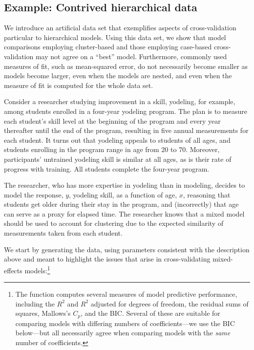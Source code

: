 \documentclass[
]{jss}
\begin{document}
\hypertarget{example-contrived-hierarchical-data}{%
\subsection{Example: Contrived hierarchical
data}\label{example-contrived-hierarchical-data}}

We introduce an artificial data set that exemplifies aspects of
cross-validation particular to hierarchical models. Using this data set,
we show that model comparisons employing cluster-based and those
employing case-based cross-validation may not agree on a ``best'' model.
Furthermore, commonly used measures of fit, such as mean-squared error,
do not necessarily become smaller as models become larger, even when the
models are nested, and even when the measure of fit is computed for the
whole data set.

Consider a researcher studying improvement in a skill, yodeling, for
example, among students enrolled in a four-year yodeling program. The
plan is to measure each student's skill level at the beginning of the
program and every year thereafter until the end of the program,
resulting in five annual measurements for each student. It turns out
that yodeling appeals to students of all ages, and students enrolling in
the program range in age from 20 to 70. Moreover, participants'
untrained yodeling skill is similar at all ages, as is their rate of
progress with training. All students complete the four-year program.

The researcher, who has more expertise in yodeling than in modeling,
decides to model the response, \(y\), yodeling skill, as a function of
age, \(x\), reasoning that students get older during their stay in the
program, and (incorrectly) that age can serve as a proxy for elapsed
time. The researcher knows that a mixed model should be used to account
for clustering due to the expected similarity of measurements taken from
each student.

We start by generating the data, using parameters consistent with the
description above and meant to highlight the issues that arise in
cross-validating mixed-effects models:\footnote{The 
  function computes several measures of model predictive performance,
  including the \(R^2\) and \(R^2\) adjusted for degrees of freedom, the
  residual sums of squares, Mallows's \(C_p\), and the BIC. Several of
  these are suitable for comparing models with differing numbers of
  coefficients---we use the BIC below---but all necessarily agree when
  comparing models with the \emph{same} number of coefficients.}
\end{document}
